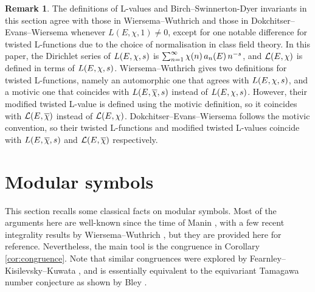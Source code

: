 \documentclass{article}
\theoremstyle{plain}
\theoremstyle{definition}
\newtheorem{remark}[n]{Remark}
\newcommand{\LLL}{\mathcal{L}}
\newcommand{\br}{\!\del}
\begin{document}
\begin{remark}
The definitions of L-values and Birch--Swinnerton-Dyer invariants in this section agree with those in Wiersema--Wuthrich \cite[Section 7]{WW22} and those in Dokchitser--Evans--Wiersema \cite[Section 1.5]{DEW21} whenever $ L(E, \chi, 1) \ne 0 $, except for one notable difference for twisted L-functions due to the choice of normalisation in class field theory. In this paper, the Dirichlet series of $ L\br{E, \chi, s} $ is $ \sum_{n = 1}^\infty \chi\br{n}a_n\br{E}n^{-s} $, and $ \LLL\br{E, \chi} $ is defined in terms of $ L\br{E, \chi, s} $. Wiersema--Wuthrich gives two definitions for twisted L-functions, namely an automorphic one that agrees with $ L\br{E, \chi, s} $, and a motivic one that coincides with $ L\br{E, \overline{\chi}, s} $ instead of $ L\br{E, \chi, s} $. However, their modified twisted L-value is defined using the motivic definition, so it coincides with $ \LLL\br{E, \overline{\chi}} $ instead of $ \LLL\br{E, \chi} $. Dokchitser--Evans--Wiersema follows the motivic convention, so their twisted L-functions and modified twisted L-values coincide with $ L\br{E, \overline{\chi}, s} $ and $ \LLL\br{E, \overline{\chi}} $ respectively.
\end{remark}

\pagebreak

\section{Modular symbols}

\label{sec:modular}

This section recalls some classical facts on modular symbols. Most of the arguments here are well-known since the time of Manin \cite{Man72}, with a few recent integrality results by Wiersema--Wuthrich \cite{WW22}, but they are provided here for reference. Nevertheless, the main tool is the congruence in Corollary \ref{cor:congruence}. Note that similar congruences were explored by Fearnley--Kisilevsky--Kuwata \cite[Theorem 3.5]{FKK12}, and is essentially equivalent to the equivariant Tamagawa number conjecture as shown by Bley \cite[Section 2]{Ble13}.
\end{document}
